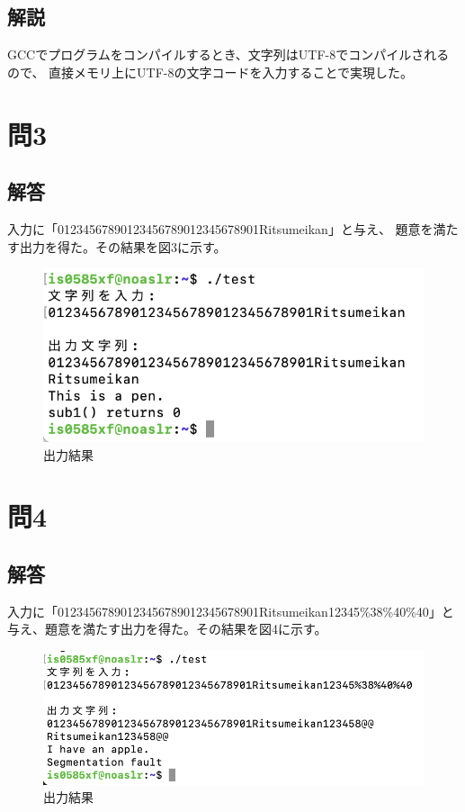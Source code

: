 \documentclass[dvipdfmx,autodetect-engine,titlepage]{jsarticle}
\begin{document}
\subsection{解説}
GCCでプログラムをコンパイルするとき、文字列はUTF-8でコンパイルされるので、
直接メモリ上にUTF-8の文字コードを入力することで実現した。

\section{問3}

\subsection{解答}
入力に「01234567890123456789012345678901Ritsumeikan」と与え、
題意を満たす出力を得た。その結果を図3に示す。

\begin{figure}[h]
  \centering
  \includegraphics[scale=1]{pic3.png}
  \caption{出力結果}
\end{figure}

\section{問4}

\subsection{解答}

入力に「01234567890123456789012345678901Ritsumeikan12345\%38\%40\%40」と与え、題意を満たす出力を得た。その結果を図4に示す。
\begin{figure}[h]
  \centering
  \includegraphics[scale=1]{pic4.png}
  \caption{出力結果}
\end{figure}
\end{document}
